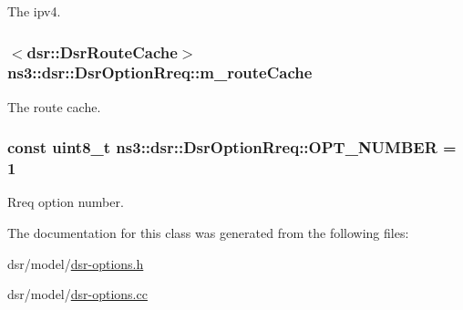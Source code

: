 The ipv4. 

\subsubsection[{\texorpdfstring{m\+\_\+route\+Cache}{m_routeCache}}]{$<${\bf dsr\+::\+Dsr\+Route\+Cache}$>$ ns3\+::dsr\+::\+Dsr\+Option\+Rreq\+::m\+\_\+route\+Cache\hspace{0.3cm}{\ttfamily [private]}}\hypertarget{classns3_1_1dsr_1_1DsrOptionRreq_a5b3482123ab67e592dc9a5ac7db70c3d}{}\label{classns3_1_1dsr_1_1DsrOptionRreq_a5b3482123ab67e592dc9a5ac7db70c3d}


The route cache. 

\subsubsection[{\texorpdfstring{O\+P\+T\+\_\+\+N\+U\+M\+B\+ER}{OPT_NUMBER}}]{\setlength{\rightskip}{0pt plus 5cm}const uint8\+\_\+t ns3\+::dsr\+::\+Dsr\+Option\+Rreq\+::\+O\+P\+T\+\_\+\+N\+U\+M\+B\+ER = 1\hspace{0.3cm}{\ttfamily [static]}}\hypertarget{classns3_1_1dsr_1_1DsrOptionRreq_a4f38d14b0638b1e527c4141f1c8795e3}{}\label{classns3_1_1dsr_1_1DsrOptionRreq_a4f38d14b0638b1e527c4141f1c8795e3}


Rreq option number. 



The documentation for this class was generated from the following files\+:\begin{DoxyCompactItemize}
\item 
dsr/model/\hyperlink{dsr-options_8h}{dsr-\/options.\+h}\item 
dsr/model/\hyperlink{dsr-options_8cc}{dsr-\/options.\+cc}\end{DoxyCompactItemize}
